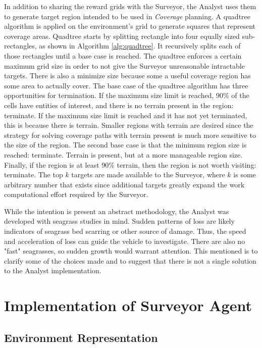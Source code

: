 \documentclass{tamuccthesis}
\begin{document}
In addition to sharing the reward grids with the Surveyor, the Analyst uses them to generate target region intended to be used in \textit{Coverage} planning. A quadtree algorithm is applied on the environment's grid to generate squares that represent coverage areas. Quadtree starts by splitting rectangle into four equally sized sub-rectangles, as shown in Algorithm \ref{alg:quadtree}. It recursively splits each of those rectangles until a base case is reached.
The quadtree enforces a certain maximum grid size in order to not give the Surveyor unreasonable intractable targets. There is also a minimize size because some a useful coverage region has some area to actually cover. The base case of the quadtree algorithm has three opportunities for termination. If the maximum size limit is reached, 90\% of the cells have entities of interest, and there is no terrain present in the region: terminate. If the maximum size limit is reached and it has not yet terminated, this is because there is terrain. Smaller regions with terrain are desired since the strategy for solving coverage paths with terrain present is much more sensitive to the size of the region. The second base case is that the minimum region size is reached: terminate. Terrain is present, but at a more manageable region size. Finally, if the region is at least 90\% terrain, then the region is not worth visiting: terminate. The top $k$ targets are made available to the Surveyor, where $k$ is some arbitrary number that exists since additional targets greatly expand the work computational effort required by the Surveyor. 

While the intention is present an abstract methodology, the Analyst was developed with seagrass studies in mind. Sudden patterns of loss are likely indicators of seagrass bed scarring or other source of damage. Thus, the speed and acceleration of loss can guide the vehicle to investigate. There are also no "fast" seagrasses, so sudden growth would warrant attention. This mentioned is to clarify some of the choices made and to suggest that there is not a single solution to the Analyst implementation. 

\section{Implementation of Surveyor Agent}

\subsection{Environment Representation}
\end{document}
